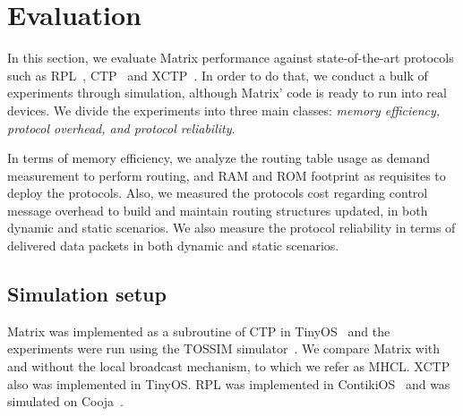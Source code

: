 \section{Evaluation}
\label{sec:results}

In this section, we evaluate Matrix performance against state-of-the-art protocols such as RPL~\cite{rfc6550}, CTP~\cite{Fonseca:2009} and XCTP~\cite{xctp}. In order to do that, we conduct a bulk of experiments through simulation, although Matrix' code is ready to run into real devices. We divide the experiments into three main classes: \textit{memory efficiency, protocol overhead, and protocol reliability}. 

In terms of memory efficiency, we analyze the routing table usage as demand measurement to perform routing, and RAM and ROM footprint as requisites to deploy the protocols. Also, we measured the protocols cost regarding control message overhead to build and maintain routing structures updated, in both dynamic and static scenarios. We also measure the protocol reliability in terms of delivered data packets in both dynamic and static scenarios.

\subsection{Simulation setup}\label{subsec:sim}

Matrix was implemented as a subroutine of CTP in TinyOS~\cite{tinyos} and the experiments were run using the TOSSIM simulator~\cite{tossim}. We compare Matrix with and without the local broadcast mechanism, to which we refer as MHCL. XCTP also was implemented in TinyOS. RPL was implemented in ContikiOS~\cite{Dunkels:2004} and was simulated on Cooja~\cite{Eriksson:2009}.


